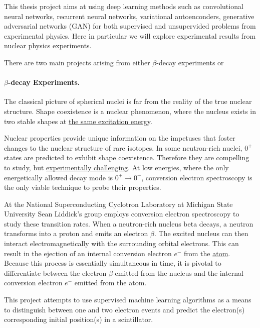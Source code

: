 \documentclass[%
oneside,                 %
final,                   %
10pt]{article}
\begin{document}
This thesis project aims at using deep learning methods such as
convolutional neural networks, recurrent neural networks, variational
autoenconders, generative adversarial networks (GAN) for both
supervised and unsupervided problems from experimental physics.  Here
in particular we will explore experimental results from nuclear
physics experiments.

There are two main projects arising from either $\beta$-decay experiments or 


\paragraph{$\beta$-decay Experiments.}
The classical picture of spherical nuclei is far from the reality of
the true nuclear structure. Shape coexistence is a nuclear phenomenon,
where the nucleus exists in two stable shapes at \href{{https://www.europhysicsnews.org/articles/epn/pdf/2001/01/epn01101.pdf}}{the same excitation
energy}.


Nuclear properties provide unique information on the impetuses that
foster changes to the nuclear structure of rare isotopes. In some
neutron-rich nuclei, $0^{+}$ states are predicted to exhibit shape
coexistence. Therefore they are compelling to study, but \href{{http://iopscience.iop.org/article/10.1088/0954-3899/43/2/024001}}{experimentally
challenging}.
At low energies, where the only energetically allowed decay mode is
$0^{+} \rightarrow 0^{+}$, conversion electron spectroscopy is the
only viable technique to probe their properties.



At the National Superconducting Cyclotron Laboratory at Michigan State
University Sean Liddick's group employs conversion electron
spectroscopy to study these transition rates. When a neutron-rich
nucleus beta decays, a neutron transforms into a proton and emits an
electron $\beta$. The excited nucleus can then interact
electromagnetically with the surrounding orbital electrons. This can
result in the ejection of an internal conversion electron $e^{-}$ from
the
\href{{https://www.sciencedirect.com/science/article/pii/S0065253908608884}}{atom}.
Because this process is essentially simultaneous in time, it is
pivotal to differentiate between the electron $\beta$ emitted from the
nucleus and the internal conversion electron $e^{-}$ emitted from the
atom.

This project attempts to use supervised machine learning algorithms as a
means to distinguish between one and two electron events and predict the
electron(s) corresponding initial position(s) in a scintillator.
\end{document}
